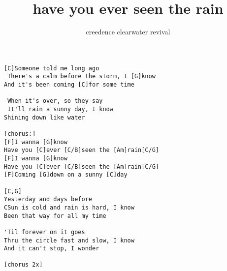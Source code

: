 \author{creedence clearwater revival}
\title{have you ever seen the rain}
\maketitle
\begin{verbatim}
[C]Someone told me long ago
 There's a calm before the storm, I [G]know
And it's been coming [C]for some time

 When it's over, so they say
 It'll rain a sunny day, I know
Shining down like water

[chorus:]
[F]I wanna [G]know
Have you [C]ever [C/B]seen the [Am]rain[C/G]
[F]I wanna [G]know
Have you [C]ever [C/B]seen the [Am]rain[C/G]
[F]Coming [G]down on a sunny [C]day

[C,G]
Yesterday and days before
CSun is cold and rain is hard, I know
Been that way for all my time

'Til forever on it goes
Thru the circle fast and slow, I know
And it can't stop, I wonder

[chorus 2x]
\end{verbatim}